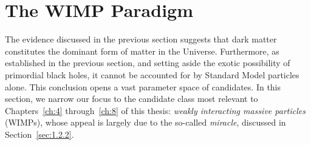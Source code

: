 
\section{The WIMP Paradigm}
\label{sec:1.2}

The evidence discussed in the previous section suggests that dark matter constitutes the dominant form of matter in the Universe. Furthermore, as established in the previous section, and setting aside the exotic possibility of primordial black holes, it cannot be accounted for by Standard Model particles alone.
This conclusion opens a vast parameter space of candidates.
%
%
In this section, we narrow our focus to the candidate class most relevant to Chapters~\ref{ch:4} through~\ref{ch:8} of this thesis: \emph{weakly interacting massive particles} (WIMPs), whose appeal is largely due to the so-called \emph{\WIMP miracle}, discussed in Section~\ref{sec:1.2.2}.


